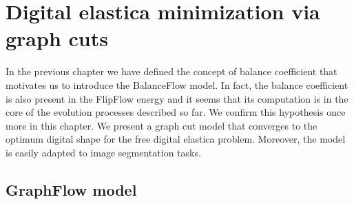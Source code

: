 \chapter{Digital elastica minimization via graph cuts}
\label{chapter:graphflow}

In the previous chapter we have defined the concept of balance coefficient that motivates us to introduce the BalanceFlow model. In fact, the balance coefficient is also present in the FlipFlow energy and it seems that its computation is in the core of the evolution processes described so far. We confirm this hypothesis once more in this chapter. We present a graph cut model that converges to the optimum digital shape for the free digital elastica problem. Moreover, the model is easily adapted to image segmentation tasks.

\section{GraphFlow model}


